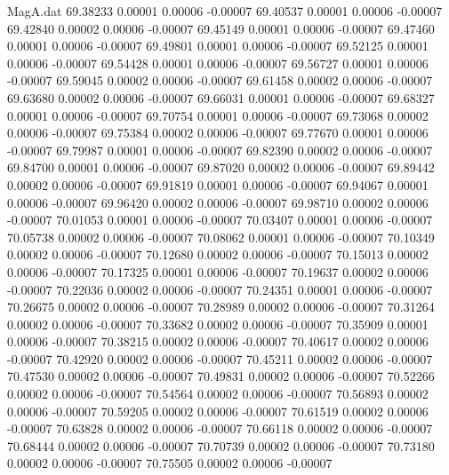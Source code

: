 \begin{filecontents}{MagA.dat}
  69.38233    0.00001    0.00006   -0.00007
  69.40537    0.00001    0.00006   -0.00007
  69.42840    0.00002    0.00006   -0.00007
  69.45149    0.00001    0.00006   -0.00007
  69.47460    0.00001    0.00006   -0.00007
  69.49801    0.00001    0.00006   -0.00007
  69.52125    0.00001    0.00006   -0.00007
  69.54428    0.00001    0.00006   -0.00007
  69.56727    0.00001    0.00006   -0.00007
  69.59045    0.00002    0.00006   -0.00007
  69.61458    0.00002    0.00006   -0.00007
  69.63680    0.00002    0.00006   -0.00007
  69.66031    0.00001    0.00006   -0.00007
  69.68327    0.00001    0.00006   -0.00007
  69.70754    0.00001    0.00006   -0.00007
  69.73068    0.00002    0.00006   -0.00007
  69.75384    0.00002    0.00006   -0.00007
  69.77670    0.00001    0.00006   -0.00007
  69.79987    0.00001    0.00006   -0.00007
  69.82390    0.00002    0.00006   -0.00007
  69.84700    0.00001    0.00006   -0.00007
  69.87020    0.00002    0.00006   -0.00007
  69.89442    0.00002    0.00006   -0.00007
  69.91819    0.00001    0.00006   -0.00007
  69.94067    0.00001    0.00006   -0.00007
  69.96420    0.00002    0.00006   -0.00007
  69.98710    0.00002    0.00006   -0.00007
  70.01053    0.00001    0.00006   -0.00007
  70.03407    0.00001    0.00006   -0.00007
  70.05738    0.00002    0.00006   -0.00007
  70.08062    0.00001    0.00006   -0.00007
  70.10349    0.00002    0.00006   -0.00007
  70.12680    0.00002    0.00006   -0.00007
  70.15013    0.00002    0.00006   -0.00007
  70.17325    0.00001    0.00006   -0.00007
  70.19637    0.00002    0.00006   -0.00007
  70.22036    0.00002    0.00006   -0.00007
  70.24351    0.00001    0.00006   -0.00007
  70.26675    0.00002    0.00006   -0.00007
  70.28989    0.00002    0.00006   -0.00007
  70.31264    0.00002    0.00006   -0.00007
  70.33682    0.00002    0.00006   -0.00007
  70.35909    0.00001    0.00006   -0.00007
  70.38215    0.00002    0.00006   -0.00007
  70.40617    0.00002    0.00006   -0.00007
  70.42920    0.00002    0.00006   -0.00007
  70.45211    0.00002    0.00006   -0.00007
  70.47530    0.00002    0.00006   -0.00007
  70.49831    0.00002    0.00006   -0.00007
  70.52266    0.00002    0.00006   -0.00007
  70.54564    0.00002    0.00006   -0.00007
  70.56893    0.00002    0.00006   -0.00007
  70.59205    0.00002    0.00006   -0.00007
  70.61519    0.00002    0.00006   -0.00007
  70.63828    0.00002    0.00006   -0.00007
  70.66118    0.00002    0.00006   -0.00007
  70.68444    0.00002    0.00006   -0.00007
  70.70739    0.00002    0.00006   -0.00007
  70.73180    0.00002    0.00006   -0.00007
  70.75505    0.00002    0.00006   -0.00007

\end{filecontents}
